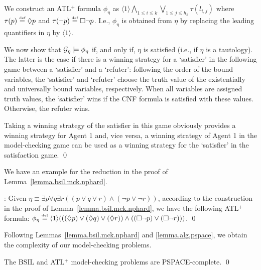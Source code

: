 We construct an ATL$^+$ formula $\phi_\eta$
as %
$\langle 1\rangle \bigwedge_{1\leq i\leq k}
\bigvee_{1\leq j\leq h_k} \tau(l_{i,j})$ 
where $\tau(p)\stackrel{\mbox{\tiny def}}{=} \Diamond p$ and $\tau(\neg p)\stackrel{\mbox{\tiny def}}{=} \Box \neg p$. 
I.e., $\phi_\eta$ is obtained from $\eta$ by replacing the leading quantifiers in $\eta$ by $\langle 1 \rangle$.

We now show that ${\cal G}_\eta \models \phi_\eta$ if, and only if, $\eta$ is satisfied (i.e., if $\eta$ is a tautology).
The  latter is the case if there is a winning strategy for a `satisfier' in the following game between a `satisfier' and a `refuter':
following the order of the bound variables, the `satisfier' and `refuter' choose the truth value of the existentially and universally bound variables, respectively.
When all variables are assigned truth values, the `satisfier' wins if the CNF formula is satisfied with these values. Otherwise, the refuter wins.

Taking a winning strategy of the satisfier in this game obviously provides a winning strategy for Agent 1 and, vice versa, a winning strategy of Agent 1 in the model-checking game can be used as a winning strategy for the `satisfier' in the satisfaction game.
\qed

We have an example for the reduction in the proof 
of Lemma~\ref{lemma.bsil.mck.nphard}.  

{\example \label{exmp.bsil.nphard}:}
Given
$\eta\equiv \exists p\forall q\exists r
((p\vee q \vee r)\wedge(\neg p \vee \neg r))$,
according to the construction
in the proof of Lemma~\ref{lemma.bsil.mck.nphard},
we have the following ATL$^+$ formula:
$\phi_\eta\stackrel{\mbox{\tiny def}}{=} 
\langle1\rangle(((\Diamond p)\vee (\Diamond q) \vee (\Diamond r))
  \wedge((\Box\neg p) \vee (\Box\neg r)))$.
\qed

Following Lemmas~\ref{lemma.bsil.mck.nphard} and
\ref{lemma.alg.pspace}, we obtain the complexity of our model-checking problems.

{\lemma\label{lemma.bsil.pspace.complete} The BSIL and ATL$^+$ model-checking
problems are PSPACE-complete.
} \qed


